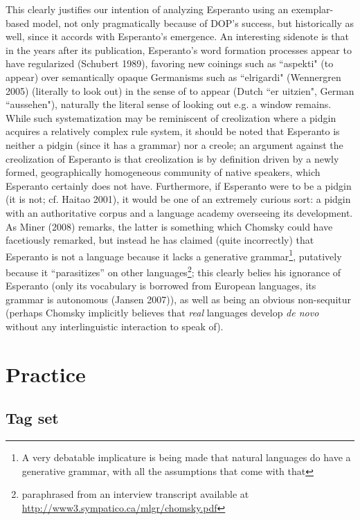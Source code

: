 \documentclass[10pt,a4paper]{article}
\begin{document}
This clearly justifies our intention of analyzing Esperanto using an
exemplar-based model, not only pragmatically because of DOP's success, but
historically as well, since it accords with Esperanto's emergence. An
interesting sidenote is that in the years after its publication, Esperanto's
word formation processes appear to have regularized (Schubert 1989), favoring
new coinings such as ``aspekti" (to appear) over semantically opaque Germanisms
such as ``elrigardi" (Wennergren 2005) (literally to look out) in the sense of
to appear (Dutch ``er uitzien", German ``aussehen"), naturally the literal sense
of looking out e.g. a window remains. While such systematization may be reminiscent of
creolization where a pidgin acquires a relatively complex rule system, it should be
noted that Esperanto is neither a pidgin (since it has a grammar) nor a creole; an
argument against the creolization of Esperanto is that creolization
is by definition driven by a newly formed, geographically homogeneous community
of native speakers, which Esperanto certainly does not have. Furthermore, if
Esperanto were to be a pidgin (it is not; cf.  Haitao 2001), it would be one of
an extremely curious sort: a pidgin with an authoritative corpus and a language
academy overseeing its development. As Miner (2008) remarks, the latter is
something which Chomsky could have facetiously remarked, but instead he has claimed
(quite incorrectly) that Esperanto is not a language because it lacks a generative
grammar\footnote{A very debatable implicature is being made that natural
languages do have a generative grammar, with all the assumptions that come with
that}, putatively because it ``parasitizes'' on other
languages\footnote{paraphrased from an interview transcript available at
\url{http://www3.sympatico.ca/mlgr/chomsky.pdf}}; this clearly belies his
ignorance of Esperanto (only its vocabulary is borrowed from European
languages, its grammar is autonomous (Jansen 2007)), as well as being an
obvious non-sequitur (perhaps Chomsky implicitly believes that {\em real}
languages develop {\em de novo} without any interlinguistic interaction to
speak of).

\pagebreak
\section{Practice}
\subsection{Tag set}
\end{document}
